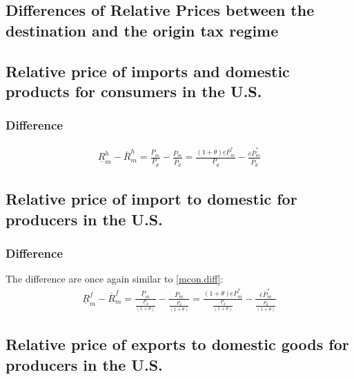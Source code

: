 \subsection*{Differences of Relative Prices between the destination and the origin tax regime}

\subsection*{Relative price of imports and domestic products for consumers in the U.S.}

\subsubsection*{Difference}
\begin{equation} \label{mcon.diff}
\begin{aligned}
\underline R^h_m - \overline R^h_m = \frac{\underline P_m}{\underline P_d} - \frac{\overline P_m}{\overline P_d}= \frac{ \left( 1 + \theta \right) \underline e \underline P^*_m}{\underline P_d} - \frac{\overline e \overline P^*_m}{\overline P_d}
\end{aligned} 
\end{equation}



\subsection*{Relative price of import to domestic for producers in the U.S.}


\subsubsection*{Difference}
The difference are once again similar to \eqref{mcon.diff}:
\begin{equation}\label{mpro.diff}
\begin{aligned}
\underline R^f_m - \overline R^f_m = \frac{\underline P_m}{\frac{\underline P_d}{ \left( 1+\theta \right) }} - \frac{\overline P_m}{\frac{\overline P_d}{ \left( 1+\theta \right) }} = \frac{ \left( 1+\theta \right) \underline e \underline P^*_m}{\frac{\underline P_d}{ \left( 1+\theta \right) }} - \frac{\overline e \overline P^*_m}{\frac{\overline P_d}{ \left( 1+\theta \right) }}
\end{aligned} 
\end{equation}




\subsection*{Relative price of exports to domestic goods for producers in the U.S.}


